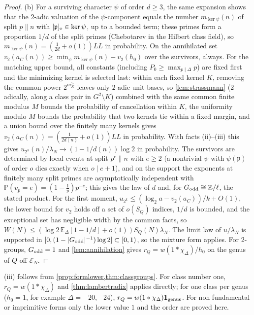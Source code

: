 \documentclass[11pt]{article}
\newcommand{\ind}{\mathbf 1}
\begin{document}
\begin{proof}
(b) For a surviving character $\psi$ of order $d\ge3$, the same expansion shows that the
$2$-adic valuation of the $\psi$-component equals the number $m_{\ker\psi}(n)$ of split $p\|n$
with $[\mathfrak p]_{\rm o}\in\ker\psi$, up to a bounded term; these primes form a proportion $1/d$
of the split primes (Chebotarev in the Hilbert class field), so $m_{\ker\psi}(n)=(\frac1{2d}+o(1))LL$
in probability. On the annihilated set $v_2(a_C(n))\ge\min_{\psi}m_{\ker\psi}(n)-v_2(h_0)$ over
the survivors, always. For the matching upper bound, all constants (including $P_0\ge\max_{p\mid\Delta}p$)
are fixed first and the minimizing kernel is selected last: within each fixed kernel $K$, removing
the common power $2^{m_K^>}$ leaves only $2$-adic unit bases, so \cref{lem:strassmann}
($2$-adically, along a class pair in $G^2\setminus K$) combined with the same common finite
modulus $M$ bounds the probability of cancellation within $K$, the uniformity modulo $M$ bounds
the probability that two kernels tie within a fixed margin, and a union bound over the finitely
many kernels gives $v_2(a_C(n))=(\frac1{2d(n)}+o(1))LL$ in probability. With facts (ii)--(iii) this
gives $u_{2^k}(n)/\lambda_N\to(1-1/d(n))\log2$ in probability. The survivors are determined by local
events at split $p^e\|n$ with $e\ge2$ (a nontrivial $\psi$ with $\psi(\mathfrak p)$ of order $o$
dies exactly when $o\mid e+1$), and on the support the exponents at finitely many split primes
are asymptotically independent with $\mathbb P(v_p=e)=(1-\frac1p)p^{-e}$; this gives the law of
$d$ and, for $G_{\rm odd}\cong\mathbb Z/\ell$, the stated product. For the first moment,
$u_{2^k}\le(\log_2a-v_2(a_C))/k+O(1)$, the lower bound for $v_2$ holds off a set of $o(S_Q)$
indices, $1/d$ is bounded, and the exceptional set has negligible width by the common facts, so
$W(N)\le(\log2\,\mathbb E_\Delta[1-1/d]+o(1))S_Q(N)\lambda_N$. The limit law of $u/\lambda_N$ is
supported in $[0,(1-|G_{\rm odd}|^{-1})\log2]\subset[0,1)$, so the mixture form applies. For
$2$-groups, $G_{\rm odd}=1$ and \cref{lem:annihilation} gives $r_Q=w(1*\chi_\Delta)/h_0$ on the
genus of $Q$ off $\mathcal E_N$.
\end{proof}

(iii) follows from \cref{prop:formlower,thm:classgroups}. For class number one,
$r_Q=w(1*\chi_\Delta)$ and \cref{thm:lambertradix} applies directly; for one class per genus
($h_0=1$, for example $\Delta=-20,-24$), $r_Q=w(1*\chi_\Delta)\ind_{\rm genus}$. For non-fundamental
or imprimitive forms only the lower value $1$ and the order are proved here.
\end{document}
